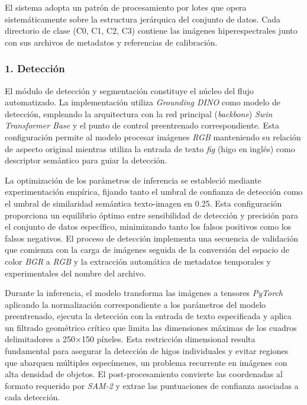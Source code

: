 \vspace{5mm}

El sistema adopta un patrón de procesamiento por lotes que opera sistemáticamente sobre la estructura jerárquica del conjunto de datos. Cada directorio de clase (C0, C1, C2, C3) contiene las imágenes hiperespectrales junto con sus archivos de metadatos y referencias de calibración.

\subsubsection{1. Detección}

El módulo de detección y segmentación constituye el núcleo del flujo automatizado. La implementación utiliza \emph{Grounding DINO} como modelo de detección, empleando la arquitectura con la red principal (\emph{backbone}) \emph{Swin Transformer Base} y el punto de control preentrenado correspondiente. Esta configuración permite al modelo procesar imágenes \emph{RGB} manteniendo su relación de aspecto original mientras utiliza la entrada de  texto \emph{fig} (higo en inglés) como descriptor semántico para guiar la detección.

\vspace{5mm}

La optimización de los parámetros de inferencia se estableció mediante experimentación empírica, fijando tanto el umbral de confianza de detección como el umbral de similaridad semántica texto-imagen en 0.25. Esta configuración proporciona un equilibrio óptimo entre sensibilidad de detección y precisión para el conjunto de datos específico, minimizando tanto los falsos positivos como los falsos negativos. El proceso de detección implementa una secuencia de validación que comienza con la carga de imágenes seguida de la conversión del espacio de color \emph{BGR} a \emph{RGB} y la extracción automática de metadatos temporales y experimentales del nombre del archivo.

\vspace{5mm}

Durante la inferencia, el modelo transforma las imágenes a tensores \emph{PyTorch} aplicando la normalización correspondiente a los parámetros del modelo preentrenado, ejecuta la detección con la entrada de texto especificada y aplica un filtrado geométrico crítico que limita las dimensiones máximas de los cuadros delimitadores a 250×150 píxeles. Esta restricción dimensional resulta fundamental para asegurar la detección de higos individuales y evitar regiones que abarquen múltiples especímenes, un problema recurrente en imágenes con alta densidad de objetos. El post-procesamiento convierte las coordenadas al formato requerido por \emph{SAM-2} y extrae las puntuaciones de confianza asociadas a cada detección.


